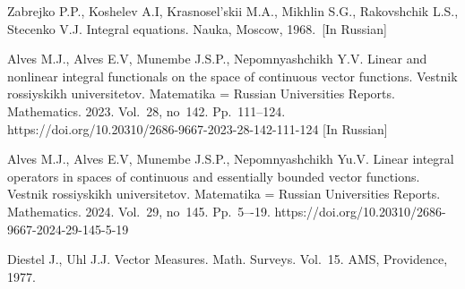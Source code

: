 \documentclass[12pt]{llncs}
\begin{document}
\begin{thebibliography}{9} 

 Zabrejko P.P., Koshelev A.I, Krasnosel'skii M.A., Mikhlin S.G., Rakovshchik L.S., Stecenko V.J. Integral equations. Nauka, Moscow, 1968.~[In Russian]

 Alves M.J., Alves E.V, Munembe J.S.P., Nepomnyashchikh Y.V. Linear and nonlinear integral functionals on the space of continuous vector functions. Vestnik rossiyskikh universitetov. Matematika = Russian Universities Reports. Mathematics. 2023. Vol.~28, no~142. Pp.~111--124. https://doi.org/10.20310/2686-9667-2023-28-142-111-124 [In Russian]

 Alves M.J., Alves E.V, Munembe J.S.P., Nepomnyashchikh Yu.V. Linear integral operators in spaces of continuous and essentially bounded vector functions. Vestnik rossiyskikh universitetov. Matematika = Russian Universities Reports. Mathematics. 2024. Vol.~29, no~145. Pp.~5–-19. https://doi.org/10.20310/2686-9667-2024-29-145-5-19

 Diestel J., Uhl J.J. Vector Measures. Math. Surveys. Vol.~15. AMS, Providence, 1977. 

\end{thebibliography}
\end{document}
